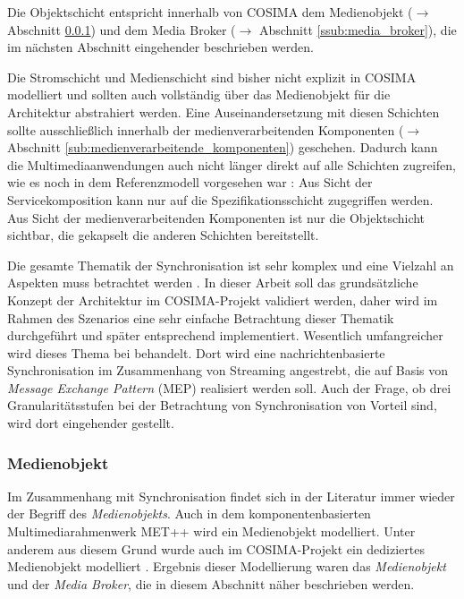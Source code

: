 
  Die Objektschicht entspricht innerhalb von COSIMA dem Medienobjekt ($\to$ Abschnitt \ref{ssub:medienobjekt}) und dem Media Broker ($\to$ Abschnitt \ref{ssub:media_broker}), die im nächsten Abschnitt eingehender beschrieben werden.
  
  Die Stromschicht und Medienschicht sind bisher nicht explizit in COSIMA modelliert und sollten auch vollständig über das Medienobjekt für die Architektur abstrahiert werden. Eine Auseinandersetzung mit diesen Schichten sollte ausschließlich innerhalb der medienverarbeitenden Komponenten ($\to$ Abschnitt \ref{sub:medienverarbeitende_komponenten}) geschehen. Dadurch kann die Multimediaanwendungen auch nicht länger direkt auf alle Schichten zugreifen, wie es noch in dem Referenzmodell vorgesehen war \citep[S. 13]{blakowski1996mss}: Aus Sicht der Servicekomposition kann nur auf die Spezifikationsschicht zugegriffen werden. Aus Sicht der medienverarbeitenden Komponenten ist nur die Objektschicht sichtbar, die gekapselt die anderen Schichten bereitstellt.

  Die gesamte Thematik der Synchronisation ist sehr komplex und eine Vielzahl an Aspekten muss betrachtet werden \citep[S. 27ff]{bericht}. In dieser Arbeit soll das grundsätzliche Konzept der Architektur im COSIMA-Projekt validiert werden, daher wird im Rahmen des Szenarios eine sehr einfache Betrachtung dieser Thematik durchgeführt und später entsprechend implementiert. Wesentlich umfangreicher wird dieses Thema bei \citep{antons09} behandelt. Dort wird eine nachrichtenbasierte Synchronisation im Zusammenhang von Streaming angestrebt, die auf Basis von \emph{Message Exchange Pattern} (MEP) realisiert werden soll. Auch der Frage, ob drei Granularitätsstufen bei der Betrachtung von Synchronisation von Vorteil sind, wird dort eingehender gestellt.


  
\subsubsection{Medienobjekt} %
\label{ssub:medienobjekt}

  Im Zusammenhang mit Synchronisation findet sich in der Literatur immer wieder der Begriff des \emph{Medienobjekts}. Auch in dem komponentenbasierten Multimediarahmenwerk MET++ \citep{ackermann1994dai} wird ein Medienobjekt modelliert. Unter anderem aus diesem Grund wurde auch im COSIMA-Projekt ein dediziertes Medienobjekt modelliert \citep{bericht}. Ergebnis dieser Modellierung waren das \emph{Medienobjekt} und der \emph{Media Broker}, die in diesem Abschnitt näher beschrieben werden.

